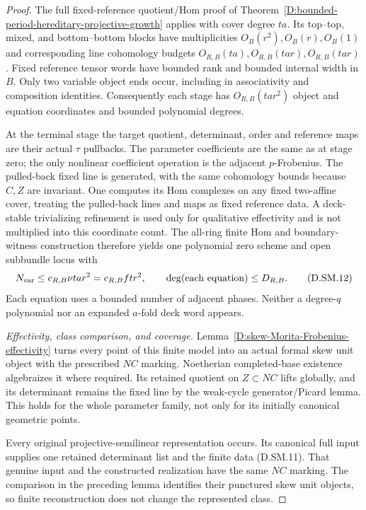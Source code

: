 \begin{proof}
The full fixed-reference quotient/Hom proof of
Theorem~\ref{D:bounded-period-hereditary-projective-growth}
applies with cover degree $ta$. Its top--top, mixed,
and bottom--bottom blocks have multiplicities
$O_B(r^2),O_B(r),O_B(1)$ and corresponding line
cohomology budgets $O_{R,B}(ta),O_{R,B}(ta r),
O_{R,B}(ta r)$. Fixed reference tensor words have
bounded rank and bounded internal width in $B$.
Only two variable object ends occur, including in
associativity and composition identities. Consequently
each stage has $O_{R,B}(ta r^2)$ object and equation
coordinates and bounded polynomial degrees.

At the terminal stage the target quotient, determinant,
order and reference maps are their actual $\tau$
pullbacks. The parameter coefficients are the same
as at stage zero; the only nonlinear coefficient
operation is the adjacent $p$-Frobenius.
The pulled-back fixed line is generated, with the
same cohomology bounds because $C,Z$ are invariant.
One computes its Hom complexes on any fixed two-affine
cover, treating the pulled-back lines and maps as fixed
reference data. A deck-stable trivializing refinement
is used only for qualitative effectivity and is not
multiplied into this coordinate count.
The all-ring finite Hom and boundary-witness construction
therefore yields one polynomial zero scheme and open
subbundle locus with
\[
 N_{\rm var}\le c_{R,B}\nu ta r^2=c_{R,B}ft r^2,
 \qquad
 \deg(\text{each equation})\le D_{R,B}.
                                                        \tag{D.SM.12}
\]
Each equation uses a bounded number of adjacent phases.
Neither a degree-$q$ polynomial nor an expanded
$a$-fold deck word appears.

\emph{Effectivity, class comparison, and coverage.}
Lemma~\ref{D:skew-Morita-Frobenius-effectivity} turns
every point of this finite model into an actual formal
skew unit object with the prescribed $NC$ marking.
Noetherian completed-base existence algebraizes it
where required. Its retained quotient on $Z\subset NC$
lifts globally, and its determinant remains the fixed
line by the weak-cycle generator/Picard lemma.
This holds for the whole parameter family, not only
for its initially canonical geometric points.

Every original projective-semilinear representation
occurs. Its canonical full input supplies one retained
determinant list and the finite data (D.SM.11).
That genuine input and the constructed realization
have the same $NC$ marking. The comparison in the
preceding lemma identifies their punctured skew
unit objects, so finite reconstruction does not
change the represented class.


\end{proof}
